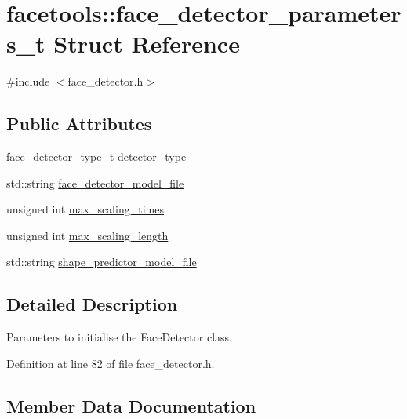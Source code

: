 \hypertarget{structfacetools_1_1face__detector__parameters__t}{}\section{facetools\+:\+:face\+\_\+detector\+\_\+parameters\+\_\+t Struct Reference}
\label{structfacetools_1_1face__detector__parameters__t}


{\ttfamily \#include $<$face\+\_\+detector.\+h$>$}

\subsection*{Public Attributes}
\begin{DoxyCompactItemize}
\item 
face\+\_\+detector\+\_\+type\+\_\+t \hyperlink{structfacetools_1_1face__detector__parameters__t_a5906194c3101a3e6e16fbce2c1cf6193}{detector\+\_\+type}
\item 
std\+::string \hyperlink{structfacetools_1_1face__detector__parameters__t_a7e3cf4aa0433b59c22252c4f05766308}{face\+\_\+detector\+\_\+model\+\_\+file}
\item 
unsigned int \hyperlink{structfacetools_1_1face__detector__parameters__t_af358725a5f3922aae3a711d3bc888471}{max\+\_\+scaling\+\_\+times}
\item 
unsigned int \hyperlink{structfacetools_1_1face__detector__parameters__t_a97e44f1fa2852e627eec6f40ac876802}{max\+\_\+scaling\+\_\+length}
\item 
std\+::string \hyperlink{structfacetools_1_1face__detector__parameters__t_a4596176e6dee1a3fa33e206c715c24a8}{shape\+\_\+predictor\+\_\+model\+\_\+file}
\end{DoxyCompactItemize}


\subsection{Detailed Description}
Parameters to initialise the Face\+Detector class. 

Definition at line 82 of file face\+\_\+detector.\+h.



\subsection{Member Data Documentation}

